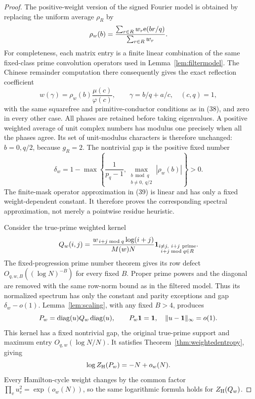 \begin{proof}
The positive-weight version of the signed Fourier model is
obtained by replacing the uniform average \(\rho_R\) by
\[
 \rho_w(b)=
       \frac{\sum_{r\in R}w_r\mathrm e(br/q)}{\sum_{r\in R}w_r}.
\]
For completeness, each matrix entry is a finite linear
combination of the same fixed-class prime convolution
operators used in Lemma~\ref{lem:filtermodel}.
The Chinese remainder computation there consequently gives
the exact reflection coefficient
\[
 w(\gamma)=\rho_w(b)\frac{\mu(c)}{\varphi(c)},\qquad
 \gamma=b/q+a/c,\quad (c,q)=1,
\]
with the same squarefree and primitive-conductor conditions
as in (38), and zero in every other case.
All phases are retained before taking eigenvalues.
A positive weighted average of unit complex numbers has
modulus one precisely when all the phases agree.
Its set of unit-modulus characters is therefore unchanged:
\(b=0,q/2\), because \(g_R=2\).
The nontrivial gap is the positive fixed number
\[
 \delta_w=
 1-\max\left\{\frac1{p_q-1},
       \max_{\substack{b\bmod q\\b\ne0,\ q/2}}|\rho_w(b)|
          \right\}>0.
\]
The finite-mask operator approximation in (39) is linear
and has only a fixed weight-dependent constant.
It therefore proves the corresponding spectral approximation,
not merely a pointwise residue heuristic.

Consider the true-prime weighted kernel
\[
 Q_w(i,j)=
 \frac{w_{\,i+j\bmod q}\log(i+j)}{M(w)N}
      \mathbf1_{\substack{i\ne j,\ i+j\ {\rm prime}\\
                       i+j\bmod q\in R}}.
\]
The fixed-progression prime number theorem gives its row
defect \(O_{q,w,B}((\log N)^{-B})\) for every fixed \(B\).
Proper prime powers and the diagonal are removed with the
same row-norm bound as in the filtered model.
Thus its normalized spectrum has only the constant and
parity exceptions and gap \(\delta_w-o(1)\).
Lemma~\ref{lem:scaling}, with any fixed \(B>4\), produces
\[
 P_w=\operatorname{diag}(u)Q_w\operatorname{diag}(u),\qquad
 P_w\mathbf1=\mathbf1,\quad
 \|u-\mathbf1\|_\infty=o(1).
\]
This kernel has a fixed nontrivial gap, the original true-prime
support and maximum entry \(O_{q,w}(\log N/N)\).
It satisfies Theorem~\ref{thm:weightedentropy}, giving
\[
 \log Z_{\rm H}(P_w)=-N+o_w(N).
\]
Every Hamilton-cycle weight changes by the common factor
\(\prod_vu_v^2=\exp(o_w(N))\), so the same logarithmic formula
holds for \(Z_{\rm H}(Q_w)\).


\end{proof}
